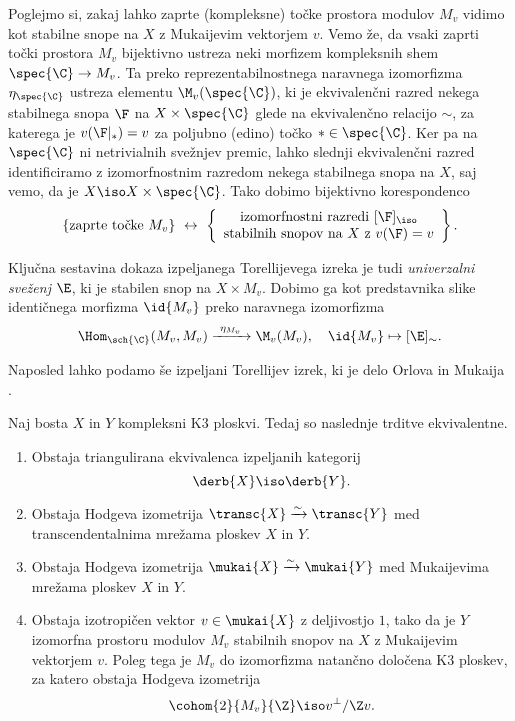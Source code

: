 Poglejmo si, zakaj lahko zaprte (\tj kompleksne) točke prostora modulov $M_v$ vidimo kot stabilne snope na $X$ z Mukaijevim vektorjem $v$. Vemo že, da vsaki zaprti točki prostora $M_v$ bijektivno ustreza neki morfizem kompleksnih shem $\spec{\C} \to M_v$. Ta preko reprezentabilnostnega naravnega izomorfizma $\eta_{\spec{\C}}$ ustreza elementu $\M_v(\spec{\C})$, ki je ekvivalenčni razred nekega stabilnega snopa $\F$ na $X \times \spec{\C}$ glede na ekvivalenčno relacijo $\sim$, za katerega je $v(\F|_*) = v$ za poljubno (edino) točko $* \in \spec{\C}$. Ker pa na $\spec{\C}$ ni netrivialnih svežnjev premic, lahko slednji ekvivalenčni razred identificiramo z izomorfnostnim razredom nekega stabilnega snopa na $X$, saj vemo, da je $X \iso X \times \spec{\C}$. Tako dobimo bijektivno korespondenco
\begin{equation*}
    \{ \text{zaprte točke $M_v$}\} \ 
    \leftrightarrow \ \left\{
        \begin{array}{c}
            \text{izomorfnostni razredi $[\F]_\iso$} \\
            \text{stabilnih snopov na $X$ z $v(\F) = v$}
        \end{array}
        \right\}.
\end{equation*}

Ključna sestavina dokaza izpeljanega Torellijevega izreka je tudi \emph{univerzalni sveženj} $\E$, ki je stabilen snop na $X \times M_v$. Dobimo ga kot predstavnika slike identičnega morfizma $\id{M_v}$ preko naravnega izomorfizma
\[
    \Hom_{\sch{\C}}(M_v, M_v) \xrightarrow{\ \eta_{M_v} \ } \M_v(M_v), \quad \id{M_v} \mapsto [\E]_\sim.
\]


Naposled lahko podamo še izpeljani Torellijev izrek, ki je delo Orlova \cite{Orlov2003} in Mukaija \cite{Mukai1987}.

\begin{izrek}
    \emph{\cite{Orlov2003,Mukai1987}}
    Naj bosta $X$ in $Y$ kompleksni K3 ploskvi. Tedaj so naslednje trditve ekvivalentne. 
    \begin{enumerate}[label = (\roman*)]
        \item Obstaja triangulirana ekvivalenca izpeljanih kategorij 
        \[
            \derb{X} \iso \derb{Y}.
        \]
        \item Obstaja Hodgeva izometrija $\transc{X} \xrightarrow{\sim} \transc{Y}$ med transcendentalnima mrežama ploskev $X$ in $Y$.
        \item Obstaja Hodgeva izometrija $\mukai{X} \xrightarrow{\sim} \mukai{Y}$ med Mukaijevima mrežama ploskev $X$ in $Y$. 
        \item Obstaja izotropičen vektor $v \in \mukai{X}$ z deljivostjo $1$, tako da je $Y$ izomorfna prostoru modulov $M_v$ stabilnih snopov na $X$ z Mukaijevim vektorjem $v$. Poleg tega je $M_v$ do izomorfizma natančno določena K3 ploskev, za katero obstaja Hodgeva izometrija 
        \[
            \cohom{2}{M_v}{\Z} \iso v^\perp / \Z v.  
        \]
    \end{enumerate}
\end{izrek}


